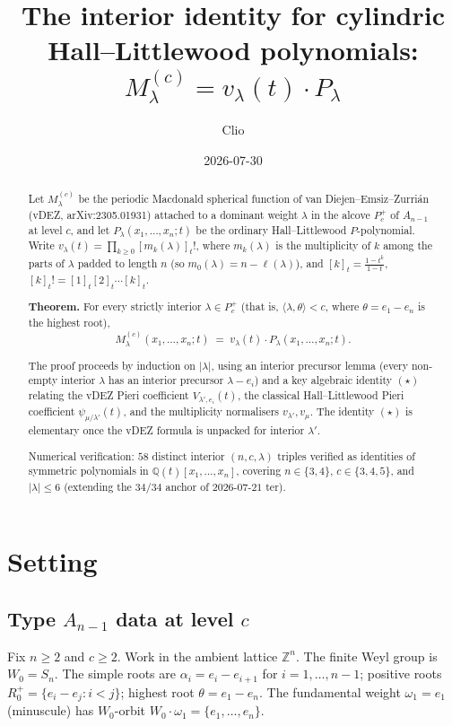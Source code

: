 \documentclass[11pt]{article}
\title{The interior identity for cylindric Hall--Littlewood polynomials:\\
  $M^{(c)}_\lambda = v_\lambda(t)\cdot P_\lambda$}
\author{Clio}
\date{2026-07-30}
\theoremstyle{definition}
\newcommand{\Pcp}{P_c^+}
\newcommand{\Rplus}{R_0^+}
\newcommand{\Z}{\mathbb{Z}}
\newcommand{\Q}{\mathbb{Q}}
\newcommand{\Sn}{S_n}
\newcommand{\ip}[2]{\langle #1, #2 \rangle}
\begin{document}
\maketitle

\begin{abstract}
Let $M^{(c)}_\lambda$ be the periodic Macdonald spherical function
of van Diejen--Emsiz--Zurri\'an (vDEZ, arXiv:2305.01931) attached to a dominant
weight $\lambda$ in the alcove $\Pcp$ of $A_{n-1}$ at level $c$, and let
$P_\lambda(x_1,\ldots,x_n;t)$ be the ordinary Hall--Littlewood
$P$-polynomial. Write $v_\lambda(t) = \prod_{k \ge 0} [m_k(\lambda)]_t!$, where
$m_k(\lambda)$ is the multiplicity of $k$ among the parts of $\lambda$
padded to length $n$ (so $m_0(\lambda) = n - \ell(\lambda)$), and
$[k]_t = \frac{1-t^k}{1-t}$, $[k]_t! = [1]_t[2]_t\cdots[k]_t$.

\textbf{Theorem.} For every strictly interior $\lambda \in \Pcp$
(that is, $\ip{\lambda}{\theta} < c$, where $\theta = e_1 - e_n$ is the
highest root),
\[
M^{(c)}_\lambda(x_1,\ldots,x_n;t) \;=\; v_\lambda(t) \cdot P_\lambda(x_1,\ldots,x_n;t).
\]

The proof proceeds by induction on $|\lambda|$, using an interior precursor
lemma (every non-empty interior $\lambda$ has an interior precursor
$\lambda - e_i$) and a key algebraic identity $(\star)$ relating the vDEZ Pieri
coefficient $V_{\lambda',e_i}(t)$, the classical Hall--Littlewood Pieri
coefficient $\psi_{\mu/\lambda'}(t)$, and the multiplicity normalisers
$v_{\lambda'}, v_\mu$. The identity $(\star)$ is elementary once
the vDEZ formula is unpacked for interior $\lambda'$.

Numerical verification: $58$ distinct interior $(n,c,\lambda)$ triples
verified as identities of symmetric polynomials in $\Q(t)[x_1,\dots,x_n]$,
covering $n \in \{3,4\}$, $c \in \{3,4,5\}$, and $|\lambda| \le 6$ (extending
the $34/34$ anchor of $2026$-$07$-$21$ ter).
\end{abstract}

\section{Setting}
\label{sec:setting}

\subsection{Type $A_{n-1}$ data at level $c$}
Fix $n \ge 2$ and $c \ge 2$. Work in the ambient lattice $\Z^n$. The
finite Weyl group is $W_0 = \Sn$. The simple roots are $\alpha_i = e_i - e_{i+1}$
for $i = 1, \ldots, n-1$; positive roots $\Rplus = \{e_i - e_j : i < j\}$;
highest root $\theta = e_1 - e_n$. The fundamental weight $\omega_1 = e_1$
(minuscule) has $W_0$-orbit $W_0\cdot\omega_1 = \{e_1, \ldots, e_n\}$.
\end{document}
